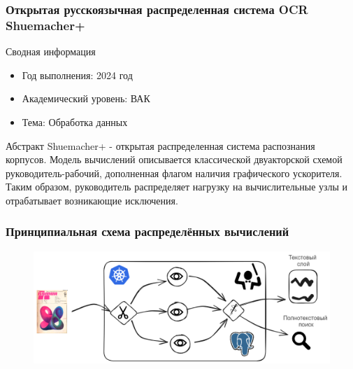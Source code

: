 \begin{frame}
    \frametitle{Открытая русскоязычная распределенная система OCR  Shuemacher+}
    \centering
    \begin{block}{Сводная информация}
        \begin{itemize}
            \item Год выполнения: 2024 год
            \item Академический уровень: ВАК
            \item Тема: Обработка данных
        \end{itemize}
    \end{block}  
    
    \begin{block}{Абстракт}
        Shuemacher+ - открытая распределенная система распознания корпусов.
        Модель вычислений описывается классической двуакторской схемой руководитель-рабочий, дополненная
        флагом наличия графического ускорителя. Таким образом,
        руководитель распределяет нагрузку на вычислительные узлы и отрабатывает возникающие
        исключения. 
    \end{block}

\end{frame}


\begin{frame}
    \frametitle{Принципиальная схема распределённых вычислений}
    \centering
    \begin{figure}
        \includegraphics[width=0.9\linewidth]{assets/saga.excalidraw.png}
    \end{figure}
\end{frame}

